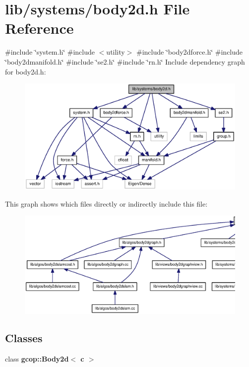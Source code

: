 \section{lib/systems/body2d.h \-File \-Reference}
\label{body2d_8h}
{\ttfamily \#include \char`\"{}system.\-h\char`\"{}}\*
{\ttfamily \#include $<$utility$>$}\*
{\ttfamily \#include \char`\"{}body2dforce.\-h\char`\"{}}\*
{\ttfamily \#include \char`\"{}body2dmanifold.\-h\char`\"{}}\*
{\ttfamily \#include \char`\"{}se2.\-h\char`\"{}}\*
{\ttfamily \#include \char`\"{}rn.\-h\char`\"{}}\*
\-Include dependency graph for body2d.\-h\-:
\nopagebreak
\begin{figure}[H]
\begin{center}
\leavevmode
\includegraphics[width=350pt]{body2d_8h__incl}
\end{center}
\end{figure}
\-This graph shows which files directly or indirectly include this file\-:
\nopagebreak
\begin{figure}[H]
\begin{center}
\leavevmode
\includegraphics[width=350pt]{body2d_8h__dep__incl}
\end{center}
\end{figure}
\subsection*{\-Classes}
\begin{DoxyCompactItemize}
\item 
class {\bf gcop\-::\-Body2d$<$ c $>$}
\end{DoxyCompactItemize}
